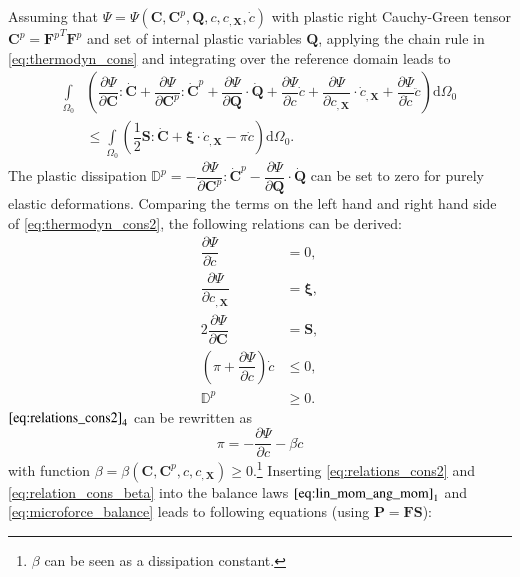 Assuming that $\Psi=\Psi\left(\mathbf{C},\mathbf{C}^{p},\mathbf{Q},c,c_{,\mathbf{X}},\dot{c}\right)$ with plastic right Cauchy-Green tensor $\mathbf{C}^{p}={\mathbf{F}^{p}}^{T}\mathbf{F}^{p}$ and set of internal plastic variables $\mathbf{Q}$, applying the chain rule in \eqref{eq:thermodyn_cons} and integrating over the reference domain leads to
\begin{equation} \label{eq:thermodyn_cons2}
	\begin{aligned}
	\int\limits_{\Omega_{0}}&\left(\dfrac{\partial\Psi}{\partial\mathbf{C}}:\dot{\mathbf{C}}+\dfrac{\partial\Psi}{\partial\mathbf{C}^{p}}:\dot{\mathbf{C}}^{p}+\dfrac{\partial\Psi}{\partial\mathbf{Q}}\cdot\dot{\mathbf{Q}}+\dfrac{\partial\Psi}{\partial c}\dot{c}+\dfrac{\partial\Psi}{\partial c_{,\mathbf{X}}}\cdot\dot{c}_{,\mathbf{X}}+\dfrac{\partial\Psi}{\partial\dot{c}}\ddot{c}\right)\mathrm{d}\Omega_{0} \\
	&\leq \int\limits_{\Omega_{0}}\left(\dfrac{1}{2}\mathbf{S}:\dot{\mathbf{C}}+\bm{\xi}\cdot\dot{c}_{,\mathbf{X}}-\pi\dot{c}\right)\mathrm{d}\Omega_{0}.
	\end{aligned}
\end{equation}
The plastic dissipation $\mathbb{D}^{p}=-\dfrac{\partial\Psi}{\partial\mathbf{C}^{p}}:\dot{\mathbf{C}}^{p}-\dfrac{\partial\Psi}{\partial\mathbf{Q}}\cdot\dot{\mathbf{Q}}$ can be set to zero for purely elastic deformations. Comparing the terms on the left hand and right hand side of \eqref{eq:thermodyn_cons2}, the following relations can be derived:
\begin{equation} \label{eq:relations_cons2}
	\begin{aligned}
		\dfrac{\partial\Psi}{\partial\dot{c}} &= 0, \\
		\dfrac{\partial\Psi}{\partial c_{,\mathbf{X}}} &= \bm{\xi}, \\
		2\dfrac{\partial\Psi}{\partial\mathbf{C}} &= \mathbf{S}, \\
		\left(\pi+\dfrac{\partial\Psi}{\partial c}\right)\dot{c} &\leq 0, \\
		\mathbb{D}^{p} &\geq 0.
	\end{aligned}
\end{equation}
$\eqref{eq:relations_cons2}_{4}$ can be rewritten as
\begin{equation} \label{eq:relation_cons_beta}
	\pi = -\dfrac{\partial\Psi}{\partial c}-\beta\dot{c}
\end{equation}
with function $\beta=\beta\left(\mathbf{C},\mathbf{C}^{p},c,c_{,\mathbf{X}}\right)\geq0$.\footnote{$\beta$ can be seen as a dissipation constant.} Inserting \eqref{eq:relations_cons2} and \eqref{eq:relation_cons_beta} into the balance laws $\eqref{eq:lin_mom_ang_mom}_{1}$ and \eqref{eq:microforce_balance} leads to following equations (using $\mathbf{P}=\mathbf{F}\mathbf{S}$):
